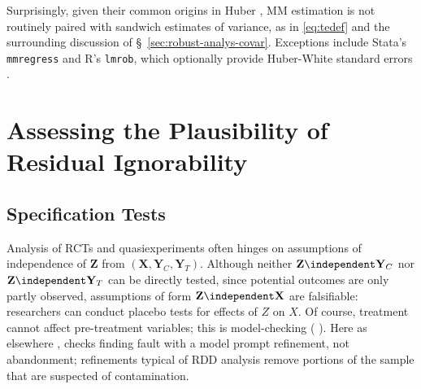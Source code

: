Surprisingly, given their common origins in %
Huber \citeyearpar{huber1964robust}, MM estimation is not routinely
paired with sandwich estimates of variance, as in \eqref{eq:tedef} and
the surrounding discussion of \S~\ref{sec:robust-analys-covar}.
Exceptions include Stata's \texttt{mmregress} and R's \texttt{lmrob},
which optionally provide Huber-White standard errors
\citep{verardiCroux2009robust,rousseuwetal2015robustbase}.

\section{Assessing the Plausibility of Residual Ignorability}

\subsection{Specification Tests}\label{sec:specification}

Analysis of RCTs and quasiexperiments often hinges on assumptions of
independence of
 $\mathbf{Z}$ from $(\mathbf{X}, \mathbf{Y}_{C}, \mathbf{Y}_{T})$.
 Although neither $\mathbf{Z} \independent \mathbf{Y}_{C}$ nor
 $\mathbf{Z} \independent \mathbf{Y}_{T}$ can be directly tested,
 since potential outcomes are only partly observed, assumptions of form
 $\mathbf{Z} \independent \mathbf{X}$ are falsifiable: researchers can
 conduct placebo tests for effects of $Z$ on $X$.
Of course, treatment cannot affect pre-treatment variables; this is
model-checking (%
\citealp[][\S~5.13]{cox2006pos}%
).  Here as
 elsewhere \citep{box1980sab}, checks finding fault with a model prompt
 refinement, not abandonment; refinements typical of RDD analysis remove portions of
 the sample that are suspected of contamination.

